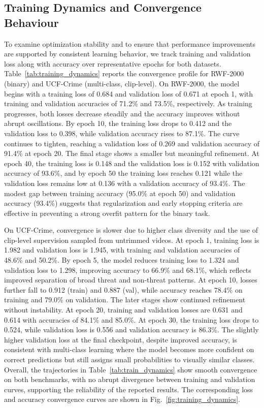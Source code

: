 \documentclass[AMA,Times1COL]{WileyNJDv5} %
\begin{document}
\subsection{Training Dynamics and Convergence Behaviour}
To examine optimization stability and to ensure that performance improvements are supported by consistent learning behavior, we track training and validation loss along with accuracy over representative epochs for both datasets. Table~\ref{tab:training_dynamics} reports the convergence profile for RWF-2000 (binary) and UCF-Crime (multi-class, clip-level). On RWF-2000, the model begins with a training loss of 0.684 and validation loss of 0.671 at epoch 1, with training and validation accuracies of 71.2\% and 73.5\%, respectively. As training progresses, both losses decrease steadily and the accuracy improves without abrupt oscillations. By epoch 10, the training loss drops to 0.412 and the validation loss to 0.398, while validation accuracy rises to 87.1\%. The curve continues to tighten, reaching a validation loss of 0.269 and validation accuracy of 91.4\% at epoch 20. The final stage shows a smaller but meaningful refinement. At epoch 40, the training loss is 0.148 and the validation loss is 0.152 with validation accuracy of 93.6\%, and by epoch 50 the training loss reaches 0.121 while the validation loss remains low at 0.136 with a validation accuracy of 93.4\%. The modest gap between training accuracy (95.0\% at epoch 50) and validation accuracy (93.4\%) suggests that regularization and early stopping criteria are effective in preventing a strong overfit pattern for the binary task.

On UCF-Crime, convergence is slower due to higher class diversity and the use of clip-level supervision sampled from untrimmed videos. At epoch 1, training loss is 1.982 and validation loss is 1.945, with training and validation accuracies of 48.6\% and 50.2\%. By epoch 5, the model reduces training loss to 1.324 and validation loss to 1.298, improving accuracy to 66.9\% and 68.1\%, which reflects improved separation of broad threat and non-threat patterns. At epoch 10, losses further fall to 0.912 (train) and 0.887 (val), while accuracy reaches 78.4\% on training and 79.0\% on validation. The later stages show continued refinement without instability. At epoch 20, training and validation losses are 0.631 and 0.614 with accuracies of 84.1\% and 85.0\%. At epoch 30, the training loss drops to 0.524, while validation loss is 0.556 and validation accuracy is 86.3\%. The slightly higher validation loss at the final checkpoint, despite improved accuracy, is consistent with multi-class learning where the model becomes more confident on correct predictions but still assigns small probabilities to visually similar classes. Overall, the trajectories in Table~\ref{tab:train_dynamics} show smooth convergence on both benchmarks, with no abrupt divergence between training and validation curves, supporting the reliability of the reported results. The corresponding loss and accuracy convergence curves are shown in Fig.~\ref{fig:training_dynamics}.
\end{document}
